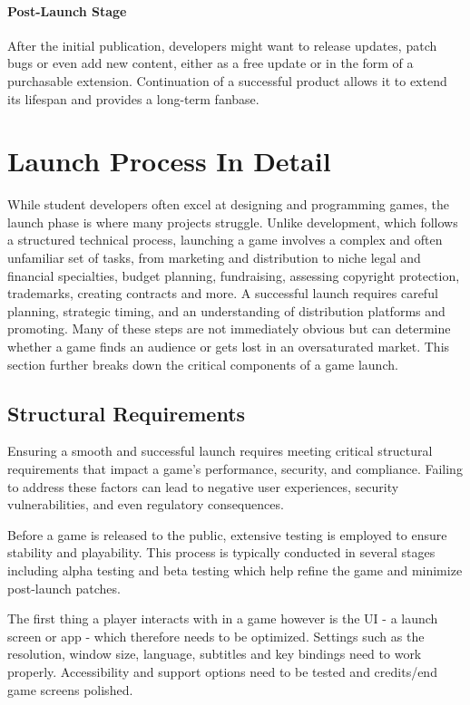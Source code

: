 \paragraph{Post-Launch Stage}
After the initial publication, developers might want to release updates, patch bugs or even add new content, either as a free update or in the form of a purchasable extension. Continuation of a successful product allows it to extend its lifespan and provides a long-term fanbase.

\section{Launch Process In Detail}
While student developers often excel at designing and programming games, the launch phase is where many projects struggle. Unlike development, which follows a structured technical process, launching a game involves a complex and often unfamiliar set of tasks, from marketing and distribution to niche legal and financial specialties, budget planning, fundraising, assessing copyright protection, trademarks, creating contracts and more. A successful launch requires careful planning, strategic timing, and an understanding of distribution platforms and promoting. Many of these steps are not immediately obvious but can determine whether a game finds an audience or gets lost in an oversaturated market. This section further breaks down the critical components of a game launch.

\subsection{Structural Requirements}
Ensuring a smooth and successful launch requires meeting critical structural requirements that impact a game’s performance, security, and compliance. Failing to address these factors can lead to negative user experiences, security vulnerabilities, and even regulatory consequences.

Before a game is released to the public, extensive testing is employed to ensure stability and playability. This process is typically conducted in several stages including alpha testing and beta testing which help refine the game and minimize post-launch patches.

The first thing a player interacts with in a game however is the UI - a launch screen or app - which therefore needs to be optimized. Settings such as the resolution, window size, language, subtitles and key bindings need to work properly. Accessibility and support options need to be tested and credits/end game screens polished.

